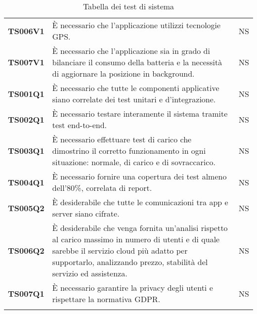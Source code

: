 \documentclass[../piano-di-qualifica.tex]{subfiles}
\begin{document}
\begin{centering}
\begin{longtable}[H]{>{\centering\bfseries}m{3cm} >{}p{10cm} >{\centering\arraybackslash}m{3cm}}
        TS006V1 & È necessario che l’applicazione utilizzi tecnologie GPS\@. \newline
                & NS \\

        TS007V1 & È necessario che l’applicazione sia in grado di bilanciare il consumo della batteria e la necessità di aggiornare la posizione in background. \newline
                & NS \\

        TS001Q1 & È necessario che tutte le componenti applicative siano correlate dei test unitari e d’integrazione. \newline
                & NS \\

        TS002Q1 & È necessario testare interamente il sistema tramite test end-to-end. \newline
                & NS \\

        TS003Q1 & È necessario effettuare test di carico che dimostrino il corretto funzionamento in ogni situazione: normale, di carico e di sovraccarico. \newline
                & NS \\

        TS004Q1 & È necessario fornire una copertura dei test almeno dell’80\%, correlata di report. \newline
                & NS \\

        TS005Q2 & È desiderabile che tutte le comunicazioni tra app e server siano cifrate. \newline
                & NS \\

        TS006Q2 & È desiderabile che venga fornita un’analisi rispetto al carico massimo in numero di utenti e di quale sarebbe il servizio cloud più adatto per supportarlo, analizzando prezzo, stabilità del servizio ed assistenza. \newline
                & NS \\

        TS007Q1 & È necessario garantire la privacy degli utenti e rispettare la normativa GDPR\@. \newline
                & NS \\

        \caption{Tabella dei test di sistema}%
        \label{tab:test_sistema}
      \end{longtable}
    \end{centering}
\end{document}
